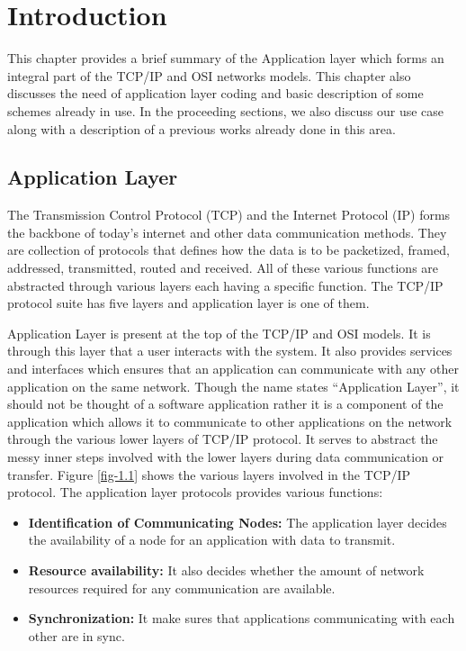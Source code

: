 \chapter{Introduction}
\label{chap-1}
\graphicspath{{Chapter_1/Vector/}{Chapter_1/}}

This chapter provides a brief summary of the Application layer which forms an integral part of the TCP/IP and OSI networks models. This chapter also discusses the need of application layer coding and basic description of some schemes already in use. In the proceeding sections, we also discuss our use case along with a description of a previous works already done in this area.

\section{Application Layer}

The Transmission Control Protocol (TCP) and the Internet Protocol (IP) forms the backbone of today's internet and other data communication methods. They are collection of protocols that defines how the data is to be packetized, framed, addressed, transmitted, routed and received. All of these various functions are abstracted through various layers each having a specific function. The TCP/IP protocol suite has five layers and application layer is one of them.

Application Layer is present at the top of the TCP/IP and OSI models. It is through this layer that a user interacts with the system. It also provides services and interfaces which ensures that an application can communicate with any other application on the same network. Though the name states ``Application Layer'', it should not be thought of a software application rather it is a component of the application which allows it to communicate to other applications on the network through the various lower layers of TCP/IP protocol. It serves to abstract the messy inner steps involved with the lower layers during data communication or transfer. Figure \ref{fig-1.1} shows the various layers involved in the TCP/IP protocol. The application layer protocols provides various functions:
\begin{itemize}
	\item \textbf{Identification of Communicating Nodes:} The application layer decides the availability of a node for an application with data to transmit.
	\item \textbf{Resource availability:} It also decides whether the amount of network resources required for any communication are available.
	\item \textbf{Synchronization:} It make sures that applications communicating with each other are in sync.
\end{itemize}


